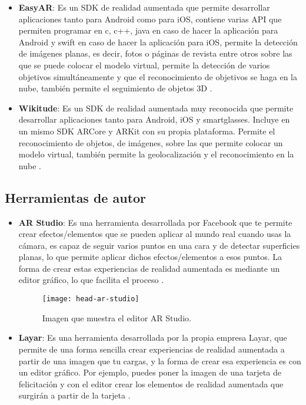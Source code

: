 \begin{itemize}
\begin{itemize}
\begin{itemize}
  \item \textbf{EasyAR}: Es un SDK de realidad aumentada que permite desarrollar aplicaciones tanto para Android como para iOS, contiene varias API que permiten programar en c, c++, java en caso de hacer la aplicación para Android y swift en caso de hacer la aplicación para iOS, permite la detección de imágenes planas, es decir, fotos o páginas de revista entre otros sobre las que se puede colocar el modelo virtual, permite la detección de varios objetivos simultáneamente y que el reconocimiento de objetivos se haga en la nube, también permite el seguimiento de objetos 3D \cite{easyar}.

  \item \textbf{Wikitude}: Es un SDK de realidad aumentada muy reconocida que permite desarrollar aplicaciones tanto para Android, iOS y smartglasses. Incluye en un mismo SDK ARCore y ARKit con su propia plataforma. Permite el reconocimiento de objetos, de imágenes, sobre las que permite colocar un modelo virtual, también permite la geolocalización y el reconocimiento en la nube \cite{wikitude}.
\end{itemize}


\subsection{Herramientas de autor}
\begin{itemize}
  \item \textbf{AR Studio}: Es una herramienta desarrollada por Facebook que te permite crear efectos/elementos que se pueden aplicar al mundo real cuando usas la cámara, es capaz de seguir varios puntos en una cara y de detectar superficies planas, lo que permite aplicar dichos efectos/elementos a esos puntos. La forma de crear estas experiencias de realidad aumentada es mediante un editor gráfico, lo que facilita el proceso \cite{ar-studio}.

  \begin{figure}[h]
    \centering
    \texttt{[image: head-ar-studio]}
    \caption{Imagen que muestra el editor AR Studio.\protect\footnotemark}
    \label{figura-arstudio}
  \end{figure}


  \newpage

  \item  \textbf{Layar}: Es una herramienta desarrollada por la propia empresa Layar, que permite de una forma sencilla crear experiencias de realidad aumentada a partir de una imagen que tu cargas, y la forma de crear esa experiencia es con un editor gráfico. Por ejemplo, puedes poner la imagen de una tarjeta de felicitación y con el editor crear los elementos de realidad aumentada que surgirán a partir de la tarjeta \cite{layar}.
\end{itemize}


\end{itemize}
\end{itemize}

